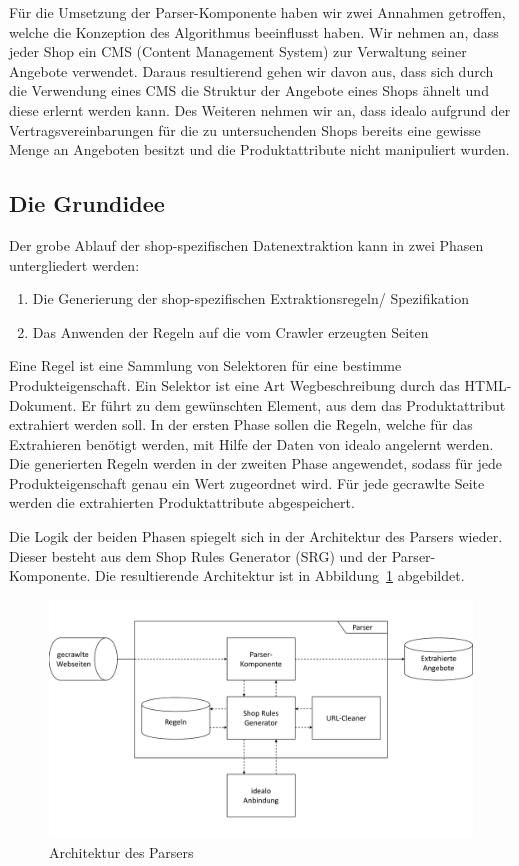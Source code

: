 Für die Umsetzung der Parser-Komponente haben wir zwei Annahmen getroffen, welche die Konzeption des Algorithmus
beeinflusst haben.
Wir nehmen an, dass jeder Shop ein CMS (Content Management System) zur Verwaltung seiner Angebote verwendet.
Daraus resultierend gehen wir davon aus, dass sich durch die Verwendung eines CMS die Struktur der Angebote eines Shops
ähnelt und diese erlernt werden kann.
Des Weiteren nehmen wir an, dass idealo aufgrund der Vertragsvereinbarungen für die zu untersuchenden Shops bereits
eine gewisse Menge an Angeboten besitzt und die Produktattribute nicht manipuliert wurden.

\subsection{Die Grundidee}
\label{subsec:grundidee}

Der grobe Ablauf der shop-spezifischen Datenextraktion kann in zwei Phasen untergliedert werden:
\begin{enumerate}
    \item Die Generierung der shop-spezifischen Extraktionsregeln/ Spezifikation
    \item Das Anwenden der Regeln auf die vom Crawler erzeugten Seiten
\end{enumerate}
Eine Regel ist eine Sammlung von Selektoren für eine bestimme Produkteigenschaft.
Ein Selektor ist eine Art Wegbeschreibung durch das HTML-Dokument.
Er führt zu dem gewünschten Element, aus dem das Produktattribut extrahiert werden soll.
In der ersten Phase sollen die Regeln, welche für das Extrahieren benötigt werden, mit Hilfe der Daten von idealo
angelernt werden.
Die generierten Regeln werden in der zweiten Phase angewendet, sodass für jede Produkteigenschaft genau ein Wert
zugeordnet wird.
Für jede gecrawlte Seite werden die extrahierten Produktattribute abgespeichert.

Die Logik der beiden Phasen spiegelt sich in der Architektur des Parsers wieder.
Dieser besteht aus dem Shop Rules Generator (SRG) und der Parser-Komponente.
Die resultierende Architektur ist in Abbildung~\ref{abb:architektur-parser} abgebildet.

\begin{figure}[H]
    \centering
    \includegraphics[width=\textwidth, trim=0 1.7cm 0 1.7cm, clip]{resources/Architektur-Parser.pdf}
    \caption{Architektur des Parsers}
    \label{abb:architektur-parser}
\end{figure}

